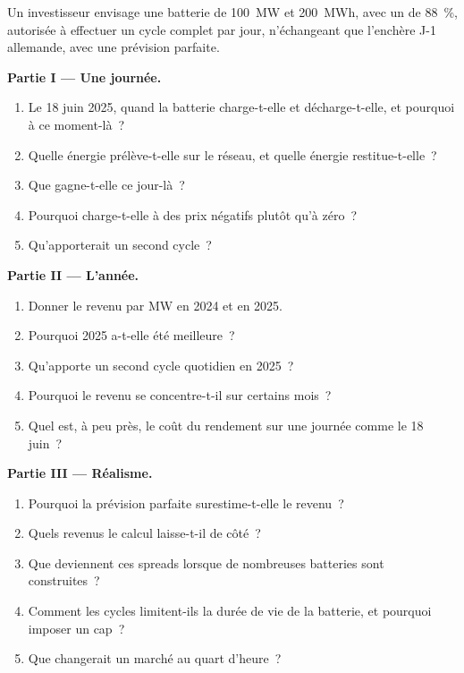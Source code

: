 \begin{problem}\label{pb:m3:power-markets-trading:1}
Un investisseur envisage une batterie de 100~MW et 200~MWh, avec un  de 88~\%, autorisée
à effectuer un cycle complet par jour, n'échangeant que l'enchère J-1 allemande, avec une prévision parfaite.

\medskip\noindent\textbf{Partie I --- Une journée.}
\begin{enumerate}
\item Le 18 juin 2025, quand la batterie charge-t-elle et décharge-t-elle, et pourquoi à ce moment-là~?
\item Quelle énergie prélève-t-elle sur le réseau, et quelle énergie restitue-t-elle~?
\item Que gagne-t-elle ce jour-là~?
\item Pourquoi charge-t-elle à des prix négatifs plutôt qu'à zéro~?
\item Qu'apporterait un second cycle~?
\end{enumerate}

\medskip\noindent\textbf{Partie II --- L'année.}
\begin{enumerate}[resume]
\item Donner le revenu par MW en 2024 et en 2025.
\item Pourquoi 2025 a-t-elle été meilleure~?
\item Qu'apporte un second cycle quotidien en 2025~?
\item Pourquoi le revenu se concentre-t-il sur certains mois~?
\item Quel est, à peu près, le coût du rendement sur une journée comme le 18 juin~?
\end{enumerate}

\medskip\noindent\textbf{Partie III --- Réalisme.}
\begin{enumerate}[resume]
\item Pourquoi la prévision parfaite surestime-t-elle le revenu~?
\item Quels revenus le calcul laisse-t-il de côté~?
\item Que deviennent ces spreads lorsque de nombreuses batteries sont construites~?
\item Comment les cycles limitent-ils la durée de vie de la batterie, et pourquoi imposer un cap~?
\item Que changerait un marché au quart d'heure~?
\end{enumerate}


\end{problem}
